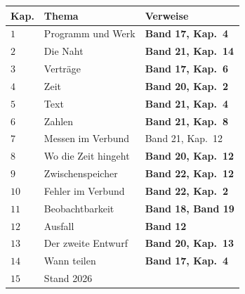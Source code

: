 \begin{merksatz}
\begin{center}
{\small
\renewcommand{\arraystretch}{1.45}
\begin{tabular}{@{}P{1.0cm}P{3.6cm}P{4.2cm}@{}}
\toprule
\textbf{Kap.} & \textbf{Thema} & \textbf{Verweise}\\
\midrule
$1$ & Programm und Werk & \textbf{Band 17, Kap.~4}\\
$2$ & Die Naht & \textbf{Band 21, Kap.~14}\\
$3$ & Verträge & \textbf{Band 17, Kap.~6}\\
$4$ & Zeit & \textbf{Band 20, Kap.~2}\\
$5$ & Text & \textbf{Band 21, Kap.~4}\\
$6$ & Zahlen & \textbf{Band 21, Kap.~8}\\
$7$ & Messen im Verbund & Band 21, Kap.~12\\
$8$ & Wo die Zeit hingeht & \textbf{Band 20, Kap.~12}\\
$9$ & Zwischenspeicher & \textbf{Band 22, Kap.~12}\\
$10$ & Fehler im Verbund & \textbf{Band 22, Kap.~2}\\
$11$ & Beobachtbarkeit & \textbf{Band 18, Band 19}\\
$12$ & Ausfall & \textbf{Band 12}\\
$13$ & Der zweite Entwurf & \textbf{Band 20, Kap.~13}\\
$14$ & Wann teilen & \textbf{Band 17, Kap.~4}\\
$15$ & Stand 2026 & \\
\bottomrule
\end{tabular}}
\end{center}
\end{merksatz}

